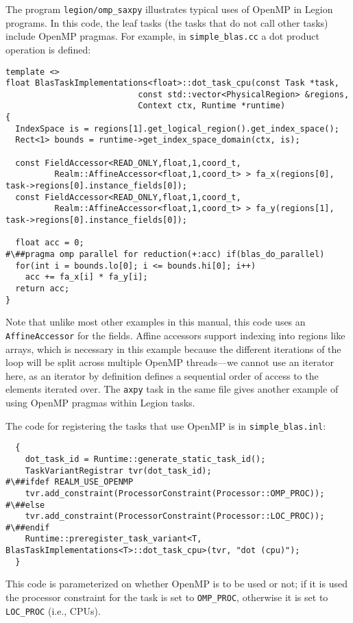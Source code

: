 The program {\tt legion/omp\_saxpy} illustrates typical uses of OpenMP in Legion programs.  In this code, the leaf tasks (the tasks
that do not call other tasks) include OpenMP pragmas.  For example, in {\tt simple\_blas.cc} a dot product operation is defined:
\begin{lstlisting}
template <>
float BlasTaskImplementations<float>::dot_task_cpu(const Task *task,
						   const std::vector<PhysicalRegion> &regions,
						   Context ctx, Runtime *runtime)
{
  IndexSpace is = regions[1].get_logical_region().get_index_space();
  Rect<1> bounds = runtime->get_index_space_domain(ctx, is);

  const FieldAccessor<READ_ONLY,float,1,coord_t,
          Realm::AffineAccessor<float,1,coord_t> > fa_x(regions[0], task->regions[0].instance_fields[0]);
  const FieldAccessor<READ_ONLY,float,1,coord_t,
          Realm::AffineAccessor<float,1,coord_t> > fa_y(regions[1], task->regions[0].instance_fields[0]);

  float acc = 0;
#\##pragma omp parallel for reduction(+:acc) if(blas_do_parallel)
  for(int i = bounds.lo[0]; i <= bounds.hi[0]; i++)
    acc += fa_x[i] * fa_y[i];
  return acc;
}
\end{lstlisting}
Note that unlike most other examples in this manual, this code uses an {\tt AffineAccessor} for the fields.  Affine accessors support indexing into regions like arrays, which is necessary in this example because the different
iterations of the loop will be split across multiple OpenMP threads---we cannot use an iterator here, as an iterator by definition defines a sequential order of access to the elements iterated over.  The {\tt axpy} task in the same file gives another example of using
OpenMP pragmas within Legion tasks.

The code for registering the tasks that use OpenMP is in {\tt simple\_blas.inl}:
\begin{lstlisting}
  {
    dot_task_id = Runtime::generate_static_task_id();
    TaskVariantRegistrar tvr(dot_task_id);
#\##ifdef REALM_USE_OPENMP
    tvr.add_constraint(ProcessorConstraint(Processor::OMP_PROC));
#\##else
    tvr.add_constraint(ProcessorConstraint(Processor::LOC_PROC));
#\##endif
    Runtime::preregister_task_variant<T, BlasTaskImplementations<T>::dot_task_cpu>(tvr, "dot (cpu)");
  }
\end{lstlisting}
This code is parameterized on whether OpenMP is to be used or not; if it is used the processor constraint for the task is set to {\tt OMP\_PROC}, otherwise it is set to {\tt LOC\_PROC} (i.e., CPUs).

